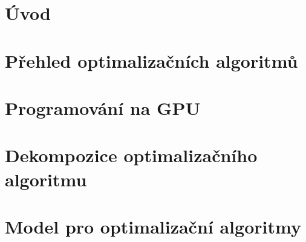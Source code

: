 \documentclass[oneside,11pt,a4paper]{report}
\newif\ifrelease %
\theoremstyle{plain}
\begin{document}
\ifrelease
\fi
    \newpage
    \tableofcontents

    \chapter*{Úvod}
        

    \chapter{Přehled optimalizačních algoritmů}\label{heuristiky}
        

    \chapter{Programování na GPU}
        

    \chapter{Dekompozice optimalizačního algoritmu}
        

    \chapter{Model pro optimalizační algoritmy}
        





    
\end{document}
